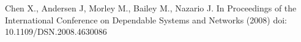 \begin{thebibliography}{4}
        Chen X., Andersen J, Morley M., Bailey M., Nazario J.
        \newblock In Proceedings of the International Conference on Dependable Systems and Networks (2008)
        \newblock doi: 10.1109/DSN.2008.4630086
\end{thebibliography}
